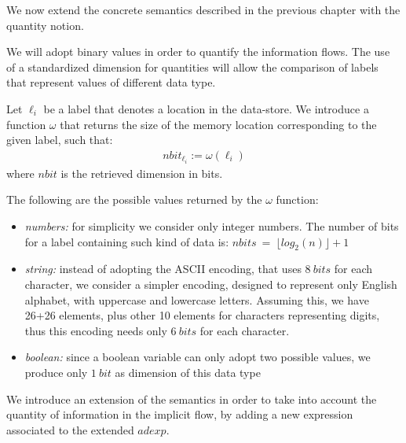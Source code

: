 \documentclass{llncs}
\begin{document}
We now extend the concrete semantics described in the previous chapter with the quantity notion. 

We will adopt binary values in order to quantify the information flows. The use of a standardized dimension for quantities will allow the comparison of labels that represent values of different data type.

\begin{definition}\label{lab_dim}
Let $\ell_i$ be a label that denotes a location in the data-store. We introduce a function $\omega$ that returns the size of the memory location corresponding to the given label, such that:
\begin{align*}
nbit_{\ell_i}:=\omega(\ell_i)
\end{align*}
where $nbit$ is the retrieved dimension in bits.
\end{definition}
The following are the possible values returned by the $\omega$ function:
\begin{itemize}
\item \emph{numbers:} for simplicity we consider only integer numbers. The number of bits for a label containing such kind of data is: $nbits\ =\ \lfloor log_2(n)\rfloor + 1$
\item \emph{string:}	instead of adopting the ASCII encoding, that uses $8\ bits$ for each character, we consider a simpler encoding, designed to represent only English alphabet, with uppercase and lowercase letters. Assuming this, we have 26+26 elements, plus other 10 elements for characters representing digits, thus this encoding needs only $6\ bits$ for each character.
\item \emph{boolean:} since a boolean variable can only adopt two possible values, we produce only $1\ bit$ as dimension of this data type
\end{itemize}


We introduce  an extension of the semantics in order to take into account the quantity of information in the implicit flow, by adding a new expression associated to the extended $adexp$. 
\end{document}
